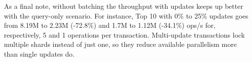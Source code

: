 \documentclass[sigconf, nonacm]{acmart}
\begin{document}

As a final note, without batching the throughput with updates keeps up better with the query-only scenario.
For instance, Top 10 with 0\% to 25\% updates goes from 8.19M to 2.23M (-72.8\%) and 1.7M to 1.12M (-34.1\%) ops/s for, respectively, 5 and 1 operations per transaction.
Multi-update transactions lock multiple shards instead of just one, so they reduce available parallelism more than single updates do.
\end{document}
